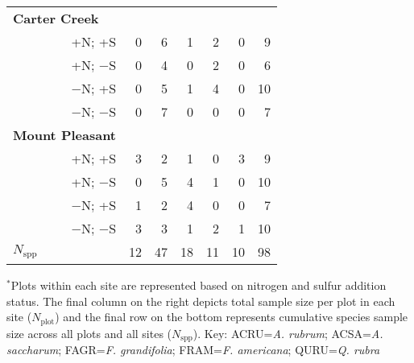 \begin{table}[h!]
{\begin{tabular}{p{2.5cm}p{1cm}p{1cm}p{1cm}p{1cm}p{1cm}p{1cm}}
        \multicolumn{1}{l}{\textbf{Carter Creek}} &&&&&&       \\
        \multicolumn{1}{r}{+N; +S}      & \multicolumn{1}{r}{0} & \multicolumn{1}{r}{6} & \multicolumn{1}{r}{1} & \multicolumn{1}{r}{2} & \multicolumn{1}{r}{0} & \multicolumn{1}{r}{9}  \\
        \multicolumn{1}{r}{+N; $-$S}    & \multicolumn{1}{r}{0} & \multicolumn{1}{r}{4} & \multicolumn{1}{r}{0} & \multicolumn{1}{r}{2} & \multicolumn{1}{r}{0} & \multicolumn{1}{r}{6}  \\
        \multicolumn{1}{r}{$-$N; +S}    & \multicolumn{1}{r}{0} & \multicolumn{1}{r}{5} & \multicolumn{1}{r}{1} & \multicolumn{1}{r}{4} & \multicolumn{1}{r}{0} & \multicolumn{1}{r}{10} \\
        \multicolumn{1}{r}{$-$N; $-$S}  & \multicolumn{1}{r}{0} & \multicolumn{1}{r}{7} & \multicolumn{1}{r}{0} & \multicolumn{1}{r}{0} & \multicolumn{1}{r}{0} & \multicolumn{1}{r}{7}  \\
        \multicolumn{1}{l}{\textbf{Mount Pleasant}}   &&&&&&    \\
        \multicolumn{1}{r}{+N; +S}      & \multicolumn{1}{r}{3} & \multicolumn{1}{r}{2} & \multicolumn{1}{r}{1} & \multicolumn{1}{r}{0} & \multicolumn{1}{r}{3} & \multicolumn{1}{r}{9}  \\
        \multicolumn{1}{r}{+N; $-$S}    & \multicolumn{1}{r}{0} & \multicolumn{1}{r}{5} & \multicolumn{1}{r}{4} & \multicolumn{1}{r}{1} & \multicolumn{1}{r}{0} & \multicolumn{1}{r}{10} \\
        \multicolumn{1}{r}{$-$N; +S}    & \multicolumn{1}{r}{1} & \multicolumn{1}{r}{2} & \multicolumn{1}{r}{4} & \multicolumn{1}{r}{0} & \multicolumn{1}{r}{0} & \multicolumn{1}{r}{7}  \\
        \multicolumn{1}{r}{$-$N; $-$S}  & \multicolumn{1}{r}{3} & \multicolumn{1}{r}{3} & \multicolumn{1}{r}{1} & \multicolumn{1}{r}{2} & \multicolumn{1}{r}{1} & \multicolumn{1}{r}{10} \\
      \hline
      \multicolumn{1}{l}{$N_\mathrm{spp}$} &  \multicolumn{1}{r}{12} & \multicolumn{1}{r}{47} & \multicolumn{1}{r}{18} & \multicolumn{1}{r}{11} & \multicolumn{1}{r}{10} & \multicolumn{1}{r}{98}
      \end{tabular}%
      }
      \end{table}
      \begin{singlespace}
        \noindent $^*$Plots within each site are represented based on nitrogen and sulfur addition status. The final column on the right depicts total sample size per plot in each site ($N_\mathrm{plot}$) and the final row on the bottom represents cumulative species sample size across all plots and all sites ($N_\mathrm{spp}$). Key: ACRU=\textit{A. rubrum}; ACSA=\textit{A. saccharum}; FAGR=\textit{F. grandifolia}; FRAM=\textit{F. americana}; QURU=\textit{Q. rubra}
      \end{singlespace}
    \clearpage

